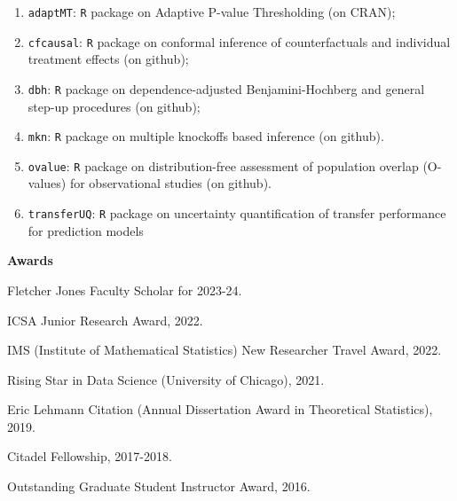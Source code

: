 \documentclass{article}
\newcommand{\red}[1]{{\color{red} #1}}
\begin{document}
\begin{enumerate}
\item \texttt{adaptMT}: \texttt{R} package on Adaptive P-value Thresholding (on CRAN);
\item \texttt{cfcausal}: \texttt{R} package on conformal inference of counterfactuals and individual treatment effects (on github);
\item \texttt{dbh}: \texttt{R} package on dependence-adjusted Benjamini-Hochberg and general step-up procedures (on github);
\item \texttt{mkn}: \texttt{R} package on multiple knockoffs based inference (on github).
\item \texttt{ovalue}: \texttt{R} package on distribution-free assessment of population overlap (O-values) for observational studies (on github).
\item \texttt{transferUQ}: \texttt{R} package on uncertainty quantification of transfer performance for prediction models
\end{enumerate}

\vspace{3mm}
\begin{large}
\noindent \textbf{Awards}
\end{large}

\vspace{5mm}

\red{Fletcher Jones Faculty Scholar for 2023-24.}

\vspace{2mm}

ICSA Junior Research Award, 2022.

\vspace{2mm}

IMS (Institute of Mathematical Statistics) New Researcher Travel Award, 2022.

\vspace{2mm}

Rising Star in Data Science (University of Chicago), 2021.

\vspace{2mm}

Eric Lehmann Citation (Annual Dissertation Award in Theoretical Statistics), 2019.

\vspace{2mm}

Citadel Fellowship, 2017-2018.

\vspace{2mm}

Outstanding Graduate Student Instructor Award, 2016.
\end{document}
